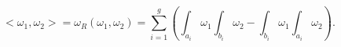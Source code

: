 \begin{equation}
\label{Rie}
<\omega_1,\omega_2>=\omega_R(\omega_1,\omega_2)=
\sum_{i=1}^g\left(\int_{a_i}\omega_1\int_{b_i}\omega_2-
\int_{b_i}\omega_1\int_{a_i}\omega_2\right).
\end{equation}

